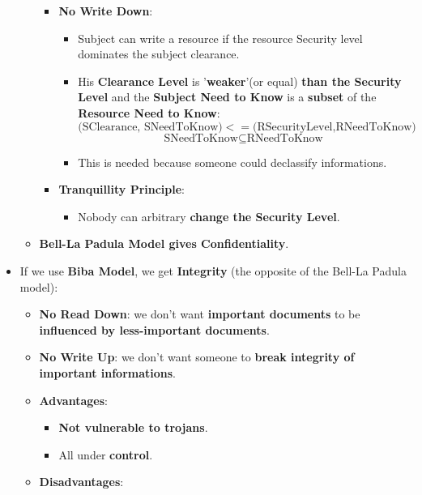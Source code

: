 \documentclass[9pt, letterpaper]{article}
\begin{document}
\begin{itemize}
\begin{itemize}
\begin{itemize}
			                  \newpage
			            \item \textbf{No Write Down}:
			                  \begin{itemize}
				                  \item Subject can write a resource if the resource Security level dominates the subject clearance.
				                  \item His \textbf{Clearance Level} is '\textbf{weaker}'(or equal) \textbf{than the Security Level} and the \textbf{Subject Need to Know} is a \textbf{subset} of the \textbf{Resource Need to Know}:
				                        $$(\mbox{SClearance, SNeedToKnow)} <= (\mbox{RSecurityLevel,RNeedToKnow)}$$
				                        $$\mbox{SNeedToKnow} \subseteq \mbox{RNeedToKnow}$$
				                  \item This is needed because someone could declassify informations.
			                  \end{itemize}
			            \item \textbf{Tranquillity Principle}:
			                  \begin{itemize}
				                  \item Nobody can arbitrary \textbf{change the Security Level}.
			                  \end{itemize}
		            \end{itemize}
		      \item \textbf{Bell-La Padula Model gives Confidentiality}.
	      \end{itemize}
	\item If we use \textbf{Biba Model}, we get \textbf{Integrity} (the opposite of the Bell-La Padula model):
	      \begin{itemize}
		      \item \textbf{No Read Down}: we don't want \textbf{important documents} to be \textbf{influenced by less-important documents}.
		      \item \textbf{No Write Up}: we don't want someone to \textbf{break integrity of important informations}.
		      \item \textbf{Advantages}:
		            \begin{itemize}
			            \item \textbf{Not vulnerable to trojans}.
			            \item All under \textbf{control}.
		            \end{itemize}
		      \item \textbf{Disadvantages}:

\end{itemize}
\end{itemize}
\end{document}
